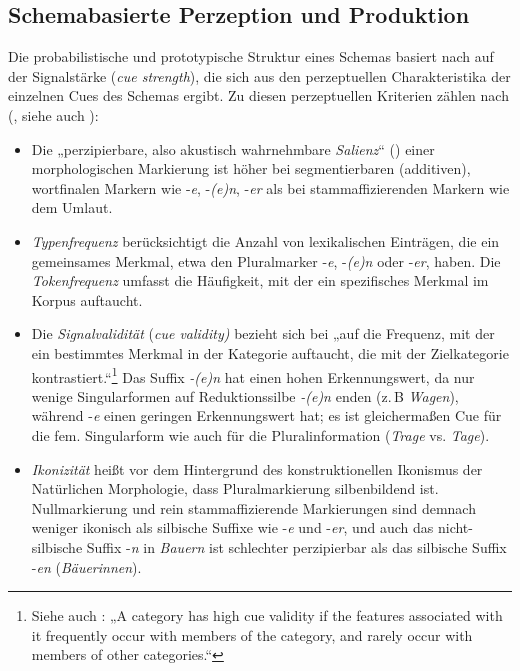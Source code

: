 \subsection{Schemabasierte Perzeption und Produktion}
\label{sec:5.3.3}
Die probabilistische und prototypische Struktur eines Schemas basiert nach \citet[82]{Köpcke1993} auf der Signalstärke (\textit{cue strength}), die sich aus den perzeptuellen Charakteristika der einzelnen Cues des Schemas ergibt. Zu diesen perzeptuellen Kriterien zählen nach \citeauthor{Köpcke1993} (\citeyear[82--83]{Köpcke1993}, siehe auch \citealt[315--316]{Köpcke1988}):

\begin{itemize}
\item Die „perzipierbare, also akustisch wahrnehmbare \textit{Salienz}“ (\citealt[82]{Köpcke1993}) einer morphologischen Markierung ist höher bei segmentierbaren (additiven), wortfinalen Markern wie -\textit{e}, -\textit{(e)n}, -\textit{er} als bei stammaffizierenden Markern wie dem Umlaut.
\item \textit{Typenfrequenz} berücksichtigt die Anzahl von lexikalischen Einträgen, die ein gemeinsames Merkmal, etwa den Pluralmarker -\textit{e}, -\textit{(e)n} oder -\textit{er}, haben. Die \textit{Tokenfrequenz} umfasst die Häufigkeit, mit der ein spezifisches Merkmal im Korpus auftaucht.
\item Die \textit{Signalvalidität} (\textit{cue validity)} bezieht sich bei \citet[82]{Köpcke1993} „auf die Frequenz, mit der ein bestimmtes Merkmal in der Kategorie auftaucht, die mit der Zielkategorie kontrastiert.“\footnote{Siehe auch \citet[266]{BybeeModer1983}: „A category has high cue validity if the features associated with it frequent\-ly occur with members of the category, and rarely occur with members of other categories.“} Das Suffix \textit{{}-(e)n} hat einen hohen Erkennungswert, da nur wenige Singularformen auf Reduktionssilbe \textit{{}-(e)n} enden (z.\,B \textit{Wagen}), während -\textit{e} einen geringen Erkennungswert hat; es ist gleichermaßen Cue für die fem. Singularform wie auch für die Pluralinformation (\textit{Trage} vs. \textit{Tage}).
\item \textit{Ikonizität} heißt vor dem Hintergrund des konstruktionellen Ikonismus der Natürlichen Morphologie, dass Pluralmarkierung silbenbildend ist. Nullmarkierung und rein stammaffizierende Markierungen sind demnach weniger ikonisch als silbische Suffixe wie -\textit{e} und -\textit{er}, und auch das nicht-silbische Suffix -\textit{n} in \textit{Bauern} ist schlechter perzipierbar als das silbische Suffix -\textit{en} (\textit{Bäuerinnen}).
\end{itemize}

